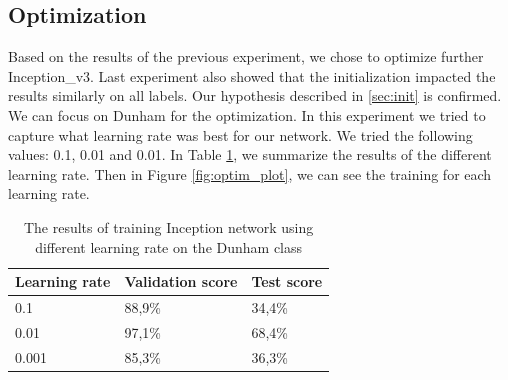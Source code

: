 \subsection{Optimization}
Based on the results of the previous experiment, we chose to optimize further Inception\_v3. Last experiment also showed that the initialization impacted the results similarly on all labels. Our hypothesis described in \ref{sec:init} is confirmed. We can focus on Dunham for the optimization.
In this experiment we tried to capture what learning rate was best for our network. We tried the following values: 0.1, 0.01 and 0.01. In Table \ref{tab:optimlr}, we summarize the results of the different learning rate. Then in Figure \ref{fig:optim_plot}, we can see the training for each learning rate. 

\begin{table}
\caption[Results according to learning rates of Inception\_v3]{\label{tab:optimlr} The results of training Inception network using different learning rate on the Dunham class}
\centering
\begin{tabular}[b]{| l | l | l |}
\hline
    Learning rate & Validation score  & Test score\\ \hline
    0.1  &  88,9\%  & 34,4\% \\ \hline
    0.01 & 97,1\% &  68,4\%\\ \hline
    0.001 & 85,3\% &  36,3\% \\ \hline
\end{tabular} 
\end{table}

